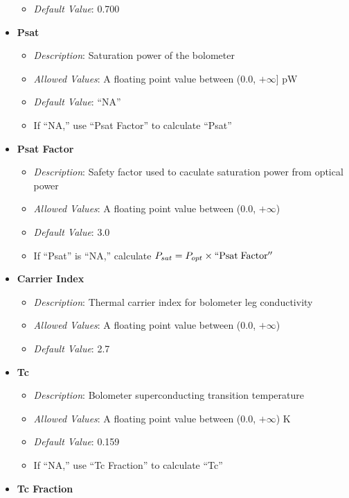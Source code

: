 \documentclass[11pt]{article} %
\begin{document}
\begin{itemize}[noitemsep,topsep=0pt]
\begin{itemize}[noitemsep,topsep=0pt]
		\item \textit{Default Value}: 0.700
		\end{itemize}
	\item \textbf{Psat}
		\begin{itemize}[noitemsep,topsep=0pt]
		\item \textit{Description}: Saturation power of the bolometer 
		\item \textit{Allowed Values}: A floating point value between (0.0, $+\infty$] pW
		\item \textit{Default Value}: ``NA''
		\item If ``NA,'' use ``Psat Factor'' to calculate ``Psat''
		\end{itemize}
	\item \textbf{Psat Factor}
		\begin{itemize}[noitemsep,topsep=0pt]
		\item \textit{Description}: Safety factor used to caculate saturation power from optical power
		\item \textit{Allowed Values}: A floating point value between (0.0, $+\infty$)
		\item \textit{Default Value}: 3.0
		\item If ``Psat'' is ``NA,'' calculate $P_{sat} = P_{opt} \times \mathrm{``Psat \; Factor''}$
		\end{itemize}
	\item \textbf{Carrier Index}
		\begin{itemize}[noitemsep,topsep=0pt]
		\item \textit{Description}: Thermal carrier index for bolometer leg conductivity 
		\item \textit{Allowed Values}: A floating point value between (0.0, $+\infty$)
		\item \textit{Default Value}: 2.7
		\end{itemize}
	\item \textbf{Tc}
		\begin{itemize}[noitemsep,topsep=0pt]
		\item \textit{Description}: Bolometer superconducting transition temperature
		\item \textit{Allowed Values}: A floating point value between (0.0, $+\infty$) K
		\item \textit{Default Value}: 0.159
		\item If ``NA,'' use ``Tc Fraction'' to calculate ``Tc''
		\end{itemize}
	\item \textbf{Tc Fraction}

\end{itemize}
\end{document}
